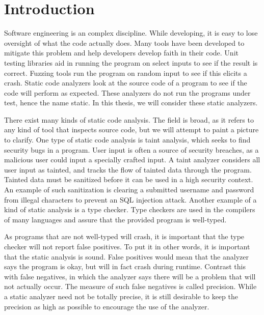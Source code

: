 \chapter{Introduction}
Software engineering is an complex discipline. While developing, it
is easy to lose oversight of what the code actually does. 
Many tools have been developed to mitigate this problem and help developers
develop faith in their code.
Unit testing libraries aid in running the program on select inputs to see 
if the result is correct. Fuzzing tools run the
program on random input to see if this elicits a crash. 
Static code analyzers look at the source code of a program to see if
the code will perform as expected. These analyzers do not run the programs under
test, hence the name static. In this thesis, we will consider these static
analyzers.

There exist many kinds of static code analysis. The field is broad, as it
refers to any kind of tool that inspects source code, but we will attempt to
paint a picture to clarify. One type of static code analysis is taint analysis,
which seeks to find security bugs in a program. User input is often a source of
security breaches, as a malicious user could input a specially crafted input. A
taint analyzer considers all user input as tainted, and tracks the flow of
tainted data through the program. Tainted data must be sanitized before it
can be used in a high security context. An example of such sanitization is
clearing a submitted username and password from illegal characters to prevent
an SQL injection attack. Another example of a kind of static analysis is a 
type checker. Type checkers are used in the compilers of many languages and 
assure that the provided program is well-typed. 

As programs that are not well-typed will crash, it is important
that the type checker will not report false positives. To put it in other 
words, it is important that the static analysis is sound. False positives would
mean that the analyzer says the program is okay, but will in fact crash during
runtime. Contrast this with false negatives, in which the analyzer says there
will be a problem that will not actually occur. The measure of such false
negatives is called precision. While a static analyzer need not be totally
precise, it is still desirable to keep the precision as high as possible to
encourage the use of the analyzer.

